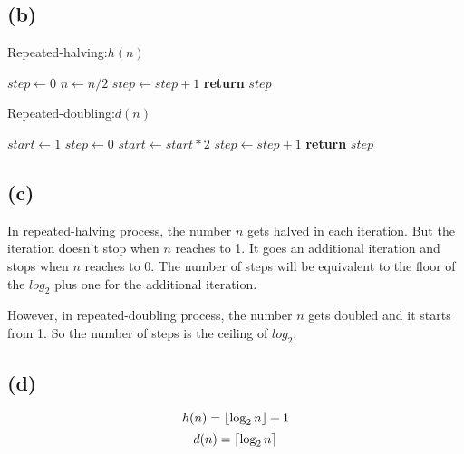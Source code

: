 \documentclass[a4paper,11pt,twoside,twocolumn]{article}
\DeclarePairedDelimiter\ceil{\lceil}{\rceil}
\DeclarePairedDelimiter\floor{\lfloor}{\rfloor}
\begin{document}
\subsection{(b)}

\begin{multicols}{2}
  
  \begin{algorithm}
    \caption{Repeated-halving:$h(n)$}\label{Repeated-halving:$h(n)$}
    \begin{algorithmic}
      \State $step\gets 0$
        \State $n\gets n/2$
        \State $step\gets step+1$
      \EndWhile
      \State \textbf{return} $step$
    \end{algorithmic}
  \end{algorithm}
 
\columnbreak
 
  \begin{algorithm}
    \caption{Repeated-doubling:$d(n)$}\label{Repeated-doubling:$d(n)$}
    \begin{algorithmic}
      \State $start\gets 1$
      \State $step\gets 0$
        \State $start\gets start*2$
        \State $step\gets step+1$
      \EndWhile
      \State \textbf{return} $step$
    \end{algorithmic}
  \end{algorithm}

\end{multicols}
\subsection{(c)}
In repeated-halving process, the number $n$ gets halved in each
iteration. But the iteration doesn't stop when $n$ reaches to 1. It
goes an additional iteration and stops when $n$ reaches to
0. The number of steps will be equivalent to the floor of the
$log_2$ plus one for the additional iteration.

However, in repeated-doubling process, the number $n$ gets doubled and
it starts from 1. So the number of steps is the ceiling of $log_2$.
\subsection{(d)}

\begin{equation*}
  h(n) = \floor*{\log_2 n} + 1
\end{equation*}
\begin{equation*}
  d(n) = \ceil*{\log_2 n}
\end{equation*}
\end{document}
